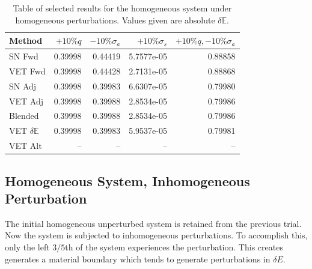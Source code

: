 \documentclass[12pt]{report}
\newcommand{\Edd}{\mathbb{E}}
\newcommand{\sigs}{\sigma_s}
\newcommand{\siga}{\sigma_a}
\begin{document}
\begin{table}[H]
\label{TableT1}
\centering
  \begin{tabular}{| l | r | r | r | r |}
    \hline
    Method  &  $+10\% q $  & $-10\% \siga $ & $+10\% \sigs $ & $+10\% q,-10\% \siga$ \\ \hline
     SN Fwd 			&0.39998 &0.44419 &5.7577e-05 & 0.88858\\ \hline
     VET Fwd			&0.39998 &0.44428 &2.7131e-05 &0.88868\\ \hline
     SN Adj			&0.39998 &0.39983 &6.6307e-05 &0.79980\\ \hline
     VET Adj 			&0.39998 &0.39988 &2.8534e-05 &0.79986\\ \hline
     Blended 			&0.39998 &0.39988 &2.8534e-05 &0.79986\\ \hline
     VET $\delta \Edd$ 	&0.39998 &0.39983 &5.9537e-05 &0.79981\\ \hline
     VET Alt			& --  & --  &	--		&  --\\ \hline
    \end{tabular}
  \caption{Table of selected results for the homogeneous system under homogeneous perturbations. Values given are absolute $\delta \Edd$. }
\end{table}


\subsection{Homogeneous System, Inhomogeneous Perturbation}
The initial homogeneous unperturbed system is retained from the previous trial. Now the system is subjected to inhomogeneous perturbations. To accomplish this, only the left $3/5$th of the system experiences the perturbation. This creates generates a material boundary which tends to generate perturbations in $\delta E$.
\end{document}
